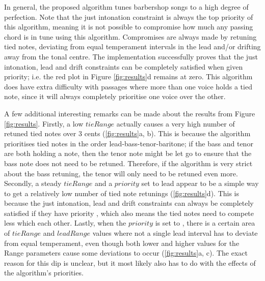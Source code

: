 \documentclass[a4paper]{article}
\begin{document}
In general, the proposed algorithm tunes barbershop songs to a high degree of perfection. Note that the just intonation constraint is always the top priority of this algorithm, meaning it is not possible to compromise how much any passing chord is in tune using this algorithm. Compromises are always made by retuning tied notes, deviating from equal temperament intervals in the lead and/or drifting away from the tonal centre. The implementation successfully proves that the just intonation, lead and drift constraints can be completely satisfied when given priority; i.e. the red plot in Figure \ref{fig:results}d remains at zero. This algorithm does have extra difficulty with passages where more than one voice holds a tied note, since it will always completely prioritise one voice over the other.

A few additional interesting remarks can be made about the results from Figure \ref{fig:results}. Firstly, a low $\mathit{tieRange}$ actually causes a very high number of retuned tied notes over 3 cents (\ref{fig:results}a, b). This is because the algorithm prioritises tied notes in the order lead-bass-tenor-baritone; if the bass and tenor are both holding a note, then the tenor note might be let go to ensure that the bass note does not need to be retuned. Therefore, if the algorithm is very strict about the bass retuning, the tenor will only need to be retuned even more. Secondly, a steady $\mathit{tieRange}$ and a $\mathit{priority}$ set to lead appear to be a simple way to get a relatively low number of tied note retunings (\ref{fig:results}d). This is because the just intonation, lead and drift constraints can always be completely satisfied if they have priority \cite{dougherty_choral_2004}, which also means the tied notes need to compete less which each other. Lastly, when the $\mathit{priority}$ is set to , there is a certain area of $\mathit{tieRange}$ and $\mathit{leadRange}$ values where not a single lead interval has to deviate from equal temperament, even though both lower and higher values for the Range parameters cause some deviations to occur (\ref{fig:results}a, c). The exact reason for this dip is unclear, but it most likely also has to do with the effects of the algorithm's priorities.
\end{document}
